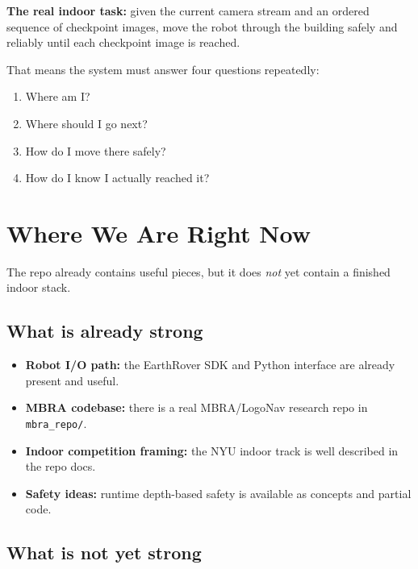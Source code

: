 \documentclass[11pt,a4paper]{article}
\begin{document}
\begin{mdframed}
\textbf{The real indoor task:} given the current camera stream and an ordered
sequence of checkpoint images, move the robot through the building safely and
reliably until each checkpoint image is reached.
\end{mdframed}

That means the system must answer four questions repeatedly:
\begin{enumerate}[nosep]
  \item Where am I?
  \item Where should I go next?
  \item How do I move there safely?
  \item How do I know I actually reached it?
\end{enumerate}


\section{Where We Are Right Now}

The repo already contains useful pieces, but it does \emph{not} yet contain a
finished indoor stack.

\subsection{What is already strong}

\begin{itemize}[nosep]
  \item \textbf{Robot I/O path:} the EarthRover SDK and Python interface are already
        present and useful.
  \item \textbf{MBRA codebase:} there is a real MBRA/LogoNav research repo in
        \texttt{mbra\_repo/}.
  \item \textbf{Indoor competition framing:} the NYU indoor track is well described in
        the repo docs.
  \item \textbf{Safety ideas:} runtime depth-based safety is available as
        concepts and partial code.
\end{itemize}

\subsection{What is not yet strong}
\end{document}
